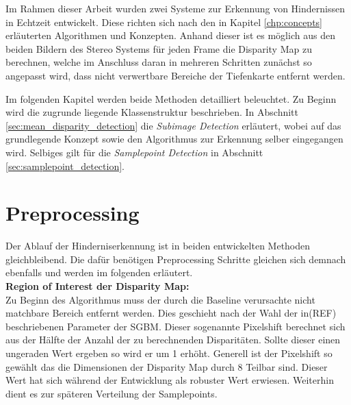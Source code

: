 Im Rahmen dieser Arbeit wurden zwei Systeme zur Erkennung von Hindernissen in Echtzeit entwickelt. Diese richten sich nach den in Kapitel \ref{chp:concepts} erläuterten Algorithmen und Konzepten. Anhand dieser ist es möglich aus den beiden Bildern des Stereo Systems für jeden Frame die Disparity Map zu berechnen, welche im Anschluss daran in mehreren Schritten zunächst so angepasst wird, dass nicht verwertbare Bereiche der Tiefenkarte entfernt werden.

\noindent
Im folgenden Kapitel werden beide Methoden detailliert beleuchtet. Zu Beginn wird die zugrunde liegende Klassenstruktur beschrieben. In Abschnitt \ref{sec:mean_disparity_detection} die \emph{Subimage Detection} erläutert, wobei auf das grundlegende Konzept sowie den Algorithmus zur Erkennung selber eingegangen wird. Selbiges gilt für die \emph{Samplepoint Detection} in Abschnitt \ref{sec:samplepoint_detection}.


\section{Preprocessing}
\label{sec:preprocessing}
Der Ablauf der Hinderniserkennung ist in beiden entwickelten Methoden gleichbleibend. Die dafür benötigen Preprocessing Schritte gleichen sich demnach ebenfalls und werden im folgenden erläutert.\\

\noindent
\textbf{Region of Interest der Disparity Map:}\\
Zu Beginn des Algorithmus muss der durch die Baseline verursachte nicht matchbare Bereich entfernt werden. Dies geschieht nach der Wahl der in(REF) beschriebenen Parameter der SGBM. Dieser sogenannte Pixelshift berechnet sich aus der Hälfte der Anzahl der zu berechnenden Disparitäten. Sollte dieser einen ungeraden Wert ergeben so wird er um 1 erhöht. Generell ist der Pixelshift so gewählt das die Dimensionen der Disparity Map durch 8 Teilbar sind. Dieser Wert hat sich während der Entwicklung als robuster Wert erwiesen. Weiterhin dient es zur späteren Verteilung der Samplepoints.\\

